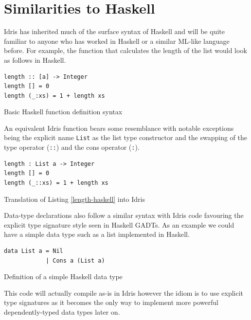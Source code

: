 \documentclass[a4paper, notitlepage]{report}
\begin{document}
\section{Similarities to Haskell}
\label{sec:orgad59fcd}
Idris has inherited much of the surface syntax of Haskell and will be quite
familiar to anyone who has worked in Haskell or a similar ML-like language
before. For example, the function that calculates the length of the list would
look as follows in Haskell.

\begin{listing}[H]
\begin{verbatim}
length :: [a] -> Integer
length [] = 0
length (_:xs) = 1 + length xs
\end{verbatim}
\caption{Basic Haskell function definition syntax \label{length-haskell}}
\end{listing}

An equivalent Idris function bears some resemblance with notable exceptions
being the explicit name \texttt{List} as the list type constructor and the swapping of
the type operator (\texttt{::}) and the cons operator (\texttt{:}).

\begin{listing}[H]
\begin{verbatim}
length : List a -> Integer
length [] = 0
length (_::xs) = 1 + length xs
\end{verbatim}
\caption{Translation of Listing \ref{length-haskell} into Idris}
\end{listing}

Data-type declarations also follow a similar syntax with Idris code favouring
the explicit type signature style seen in Haskell GADTs. As an example we could
have a simple data type such as a list implemented in Haskell.

\begin{listing}[H]
\begin{verbatim}
data List a = Nil
            | Cons a (List a)
\end{verbatim}
\caption{Definition of a simple Haskell data type \label{list-haskell}}
\end{listing}

This code will actually compile as-is in Idris however the idiom is to use
explicit type signatures as it becomes the only way to implement more powerful
dependently-typed data types later on.
\end{document}
